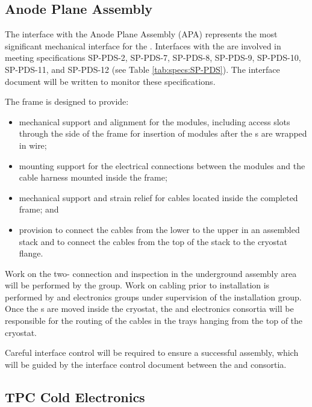 \subsection{Anode Plane Assembly}

The interface with the Anode Plane Assembly (APA) represents the most significant mechanical interface for the . Interfaces with the  are involved in meeting specifications SP-PDS-2, SP-PDS-7, SP-PDS-8, SP-PDS-9, SP-PDS-10, SP-PDS-11, and SP-PDS-12 (see Table \ref{tab:specs:SP-PDS}).  The interface document will be written to monitor these specifications.

The  frame is designed to provide:
\begin{itemize}
\item mechanical support and alignment for the  modules, including access slots through the side of the frame for insertion of modules after the s are wrapped in wire;
\item mounting support for the  electrical connections between the  modules and the cable harness mounted inside the  frame;
\item mechanical support and strain relief for  cables located inside the completed  frame; and
\item provision to connect the  cables from the lower  to the upper  in an assembled  stack and to connect the  
cables from the top of the  stack to the cryostat flange.
\end{itemize}

Work on the two- connection and inspection in the underground assembly area will be performed by the  group. Work on cabling prior to installation is performed by  and  electronics groups under supervision of the  installation group. Once the s are moved inside the cryostat, the  and electronics consortia will be responsible for the routing of the cables in the trays hanging from the top of the cryostat. 

Careful interface control will be required to ensure a successful assembly, which will be guided by the interface control document between the  and  consortia.  

\subsection{TPC Cold Electronics}
\label{sec:fdsp-pd-intfc-ce}

